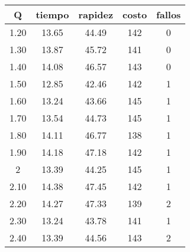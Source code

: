 \begin{table}[h!]
\centering
\begin{tabular}{ccccc}
Q & tiempo & rapidez & costo & fallos \\ 
\hline 
1.20 & 13.65 & 44.49 & 142 & 0 \\ 
1.30 & 13.87 & 45.72 & 141 & 0 \\ 
1.40 & 14.08 & 46.57 & 143 & 0 \\ 
1.50 & 12.85 & 42.46 & 142 & 1 \\ 
1.60 & 13.24 & 43.66 & 145 & 1 \\ 
1.70 & 13.54 & 44.73 & 145 & 1 \\ 
1.80 & 14.11 & 46.77 & 138 & 1 \\ 
1.90 & 14.18 & 47.18 & 142 & 1 \\ 
2 & 13.39 & 44.25 & 145 & 1 \\ 
2.10 & 14.38 & 47.45 & 142 & 1 \\ 
2.20 & 14.27 & 47.33 & 139 & 2 \\ 
2.30 & 13.24 & 43.78 & 141 & 1 \\ 
2.40 & 13.39 & 44.56 & 143 & 2 \\ 
\hline 
\end{tabular}
\end{table}